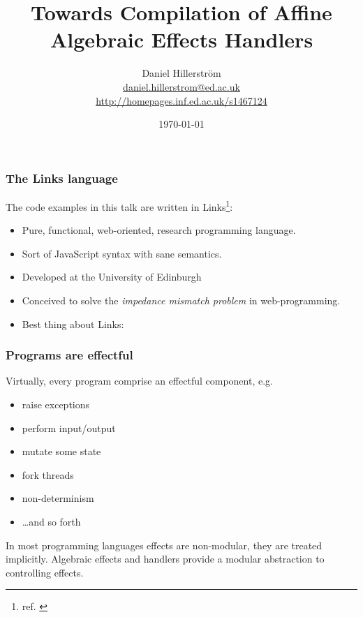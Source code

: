 \documentclass[10pt,compress]{beamer}
\author[Daniel Hillerström]{Daniel Hillerström\\\footnotesize{\href{mailto:daniel.hillerstrom@ed.ac.uk}{daniel.hillerstrom@ed.ac.uk}}\\\href{http://homepages.inf.ed.ac.uk/s1467124}{http://homepages.inf.ed.ac.uk/s1467124}}
\title{Towards Compilation of Affine Algebraic Effects Handlers}
\institute{The University of Edinburgh}
\date{\today}
\begin{document}
\begin{frame}[plain]
  \maketitle
\end{frame}

\begin{frame}
  \frametitle{The Links language}
The code examples in this talk are written in Links\footnote{ref. \citet{Cooper2006}}:
\begin{itemize}
  \item Pure, functional, web-oriented, research programming language.
  \item Sort of JavaScript syntax with sane semantics.
  \item Developed at the University of Edinburgh
  \item Conceived to solve the \emph{impedance mismatch problem} in web-programming.
  \item Best thing about Links: 
\end{itemize}
\end{frame}

\begin{frame}
  \frametitle{Programs are effectful}
Virtually, every program comprise an \alert<1->{effectful} component, e.g.
\begin{itemize}
  \item raise exceptions
  \item perform input/output
  \item mutate some state
  \item fork threads
  \item non-determinism
  \item \dots and so forth 
\end{itemize}
In most programming languages effects are non-modular, they are treated implicitly.
Algebraic effects and handlers provide a modular abstraction to controlling effects.
\end{frame}
\end{document}
